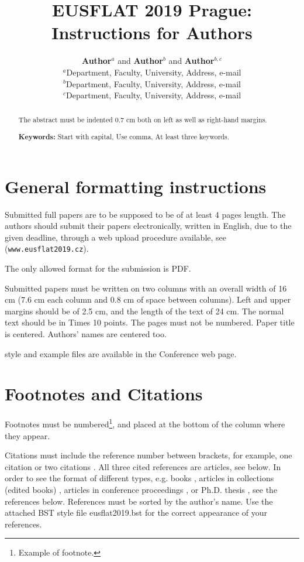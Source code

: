 \documentclass{eusflat2019}
\title{\bf EUSFLAT 2019 Prague: Instructions for Authors}
\author{{\bf Author$^a$} and {\bf Author$^b$} and {\bf Author$^{b,c}$}\\
$^a$Department, Faculty, University, Address, e-mail \\ $^b$Department, Faculty, University, Address, e-mail \\
$^c$Department, Faculty, University, Address, e-mail}
\begin{document}
\maketitle
\begin{abstract}
The abstract must be indented 0.7 cm both on left as well as right-hand
margins.

{\bf Keywords:} Start with capital, Use comma, At least three
keywords.
\end{abstract}

\section{General formatting instructions}

Submitted full papers are to be supposed to be of at least 4 pages
length. The authors should submit their papers electronically,
written in English, due to the given deadline, through a web upload
procedure available, see ({\tt www.eusflat2019.cz}).

The only allowed format for the submission is PDF.

Submitted papers must be written on two columns with an overall width of 16 cm
(7.6 cm each column and 0.8 cm of space between columns). Left and upper
margins should be of 2.5 cm, and the length of the text of 24 cm. The normal
text should be in Times 10 points. The pages must not be numbered. Paper title
is centered. Authors' names are centered too.

\LaTeXe{} style and example files are available in the Conference
web page.

\section{Footnotes and Citations}

Footnotes must be numbered\footnote{Example of footnote.}, and placed at the
bottom of the column where they appear.

Citations must include the reference number between brackets, for
example, one citation \cite{Zadeh75} or two citations
\cite{Zadeh75b,Zadeh75c}. All three cited references are articles,
see below. In order to see the format of different types, e.g. books
\cite{Gottwald93,NovakPerfilievaMockor99,KlementMesiarPap00},
articles in collections (edited books)
\cite{BandlerKohout80b,NavaraPetrik_EUSFLAT07}, articles in
conference proceedings \cite{DuboisNakata_IFSA97}, or Ph.D. thesis
\cite{EsterPhD}, see the references below. References must be sorted
by the author's name. Use the attached BST style file
eusflat2019.bst for the correct appearance of your references.
\end{document}
